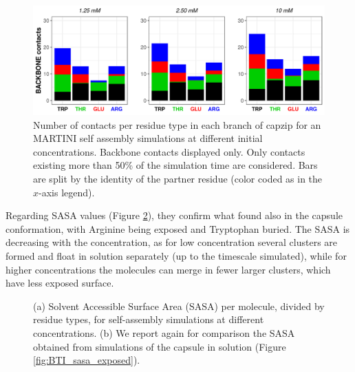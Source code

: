 \begin{figure}[t!]
\centering\includegraphics[width=0.95\linewidth]{3results_capsule/pics/contacts_SA.png} 
\caption[Self-assembly simulations: contacts]{Number of contacts per residue type in each branch of capzip for an MARTINI self assembly simulations at different initial concentrations. Backbone contacts displayed only. Only contacts existing more than 50\% of the simulation time are considered. Bars are split by the identity of the partner residue (color coded as in the $x$-axis legend).}
\label{fig:SA_contacts}
\end{figure}
%
Regarding SASA values (Figure \ref{fig:SA_sasa_all}), they confirm what found also in the capsule conformation, with Arginine being exposed and Tryptophan buried. The SASA is decreasing with the concentration, as for low concentration several clusters are formed and float in solution separately (up to the timescale simulated), while for higher concentrations the molecules can merge in fewer larger clusters, which have less exposed surface.
%
\begin{figure}[t!]
\caption[Self-assembly simulations: SASA]{(a) Solvent Accessible Surface Area (SASA) per molecule, divided by residue types, for self-assembly simulations at different concentrations. (b) We report again for comparison the SASA obtained from simulations of the capsule in solution (Figure \ref{fig:BTI_sasa_exposed}).}
\label{fig:SA_sasa_all}
\end{figure}

